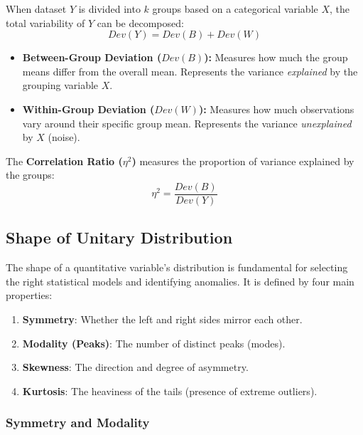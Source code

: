 When dataset $Y$ is divided into $k$ groups based on a categorical variable $X$, the total variability of $Y$ can be decomposed:
\begin{equation}
    Dev(Y) = Dev(B) + Dev(W)
\end{equation}

\begin{itemize}
    \item \textbf{Between-Group Deviation ($Dev(B)$):} Measures how much the group means differ from the overall mean. Represents the variance \textit{explained} by the grouping variable $X$.
    \item \textbf{Within-Group Deviation ($Dev(W)$):} Measures how much observations vary around their specific group mean. Represents the variance \textit{unexplained} by $X$ (noise).
\end{itemize}

The \textbf{Correlation Ratio ($\eta^2$)} measures the proportion of variance explained by the groups:
\begin{equation}
    \eta^2 = \frac{Dev(B)}{Dev(Y)}
\end{equation}

\subsection{Shape of Unitary Distribution}

The shape of a quantitative variable's distribution is fundamental for selecting the right statistical models and identifying anomalies. It is defined by four main properties:

\begin{enumerate}
    \item \textbf{Symmetry}: Whether the left and right sides mirror each other.
    \item \textbf{Modality (Peaks)}: The number of distinct peaks (modes).
    \item \textbf{Skewness}: The direction and degree of asymmetry.
    \item \textbf{Kurtosis}: The heaviness of the tails (presence of extreme outliers).
\end{enumerate}

\subsubsection{Symmetry and Modality}

